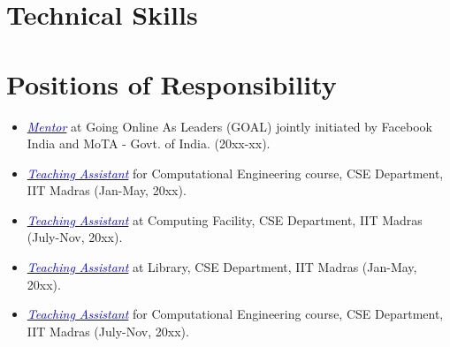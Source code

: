\documentclass[11pt,a4paper,sans]{moderncv}
\begin{document}


\vspace{-1em}
\section{Technical Skills}





\vspace{-1em}
\section{Positions of Responsibility}
\begin{itemize}
\item \textit{{\href{https://someLinks}{\textcolor{blue}{Mentor}}}} at Going Online As Leaders (GOAL) jointly initiated by Facebook India and MoTA - Govt. of India. (20xx-xx).

\item \textit{{\href{https://someLinks}{\textcolor{blue}{Teaching Assistant}}}} for Computational Engineering course, CSE Department, IIT Madras (Jan-May, 20xx).

\item \textit{{\href{https://someLinks}{\textcolor{blue}{Teaching Assistant}}}} at Computing Facility, CSE Department, IIT Madras (July-Nov, 20xx). 

\item \textit{{\href{https://someLinks}{\textcolor{blue}{Teaching Assistant}}}} at Library, CSE Department, IIT Madras (Jan-May, 20xx).

\item \textit{{\href{https://someLinks}{\textcolor{blue}{Teaching Assistant}}}} for Computational Engineering course, CSE Department, IIT Madras (July-Nov, 20xx).
\end{itemize}
\end{document}
